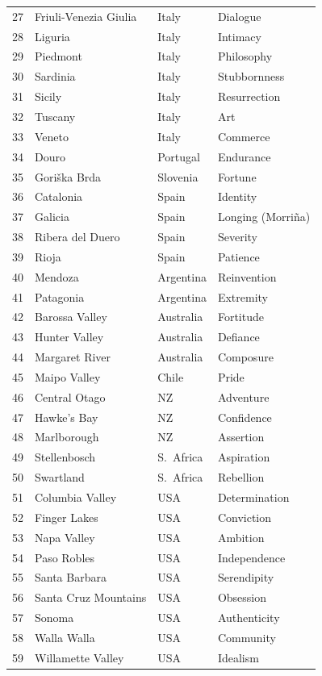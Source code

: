 \documentclass[11pt]{article}
\begin{document}
\begin{center}
\begin{tabular}{@{}r l l l@{}}
27 & Friuli-Venezia Giulia & Italy     & Dialogue \\
28 & Liguria              & Italy      & Intimacy \\
29 & Piedmont             & Italy      & Philosophy \\
30 & Sardinia             & Italy      & Stubbornness \\
31 & Sicily               & Italy      & Resurrection \\
32 & Tuscany              & Italy      & Art \\
33 & Veneto               & Italy      & Commerce \\
34 & Douro                & Portugal   & Endurance \\
35 & Gori\v{s}ka Brda     & Slovenia   & Fortune \\
36 & Catalonia            & Spain      & Identity \\
37 & Galicia              & Spain      & Longing (Morri\~na) \\
38 & Ribera del Duero     & Spain      & Severity \\
39 & Rioja                & Spain      & Patience \\
40 & Mendoza              & Argentina  & Reinvention \\
41 & Patagonia            & Argentina  & Extremity \\
42 & Barossa Valley       & Australia  & Fortitude \\
43 & Hunter Valley        & Australia  & Defiance \\
44 & Margaret River       & Australia  & Composure \\
45 & Maipo Valley         & Chile      & Pride \\
46 & Central Otago        & NZ         & Adventure \\
47 & Hawke's Bay          & NZ         & Confidence \\
48 & Marlborough          & NZ         & Assertion \\
49 & Stellenbosch         & S.\ Africa & Aspiration \\
50 & Swartland            & S.\ Africa & Rebellion \\
51 & Columbia Valley      & USA        & Determination \\
52 & Finger Lakes         & USA        & Conviction \\
53 & Napa Valley          & USA        & Ambition \\
54 & Paso Robles          & USA        & Independence \\
55 & Santa Barbara        & USA        & Serendipity \\
56 & Santa Cruz Mountains & USA        & Obsession \\
57 & Sonoma               & USA        & Authenticity \\
58 & Walla Walla          & USA        & Community \\
59 & Willamette Valley    & USA        & Idealism \\
\bottomrule
\end{tabular}
\end{center}
\end{document}
